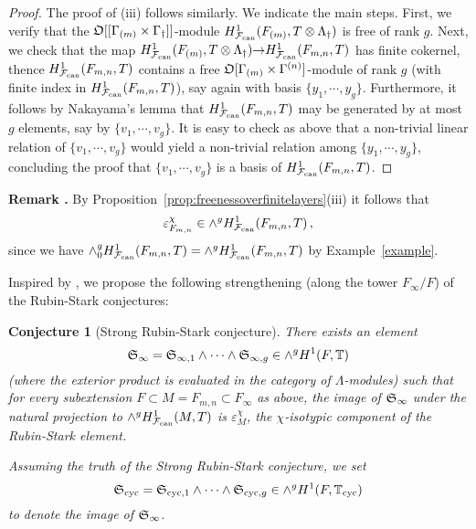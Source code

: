\documentclass[12pt]{amsart}
\numberwithin{equation}{section}
\newtheorem{conj}[thm]{Conjecture}
\newenvironment{rem}{\par\medskip\noindent\refstepcounter{thm}
\bgroup{\hspace*{-0.15 cm}\bf{Remark} \thethm.}\bgroup}{\egroup
\egroup\par\medskip} \parskip 2pt
\begin{document}
\begin{proof}
The proof of (iii) follows similarly. We indicate the main steps. First, we verify that the ${\frak{O}}[[\Gamma_{(m)}\times\Gamma_\dagger]]$-module $H^1_{\mathcal{F}_{\textup{\lowercase{can}}}}(F_{(m)},T\otimes{\Lambda}_{\dagger})$ is free of rank $g$. Next, we check that  the map $H^1_{\mathcal{F}_{\textup{\lowercase{can}}}}(F_{(m)},T\otimes{\Lambda}_{\dagger}){\rightarrow} H^1_{\mathcal{F}_{\textup{\lowercase{can}}}}(F_{m,n},T)$ has finite cokernel, thence $H^1_{\mathcal{F}_{\textup{\lowercase{can}}}}(F_{m,n},T)$ contains a free ${\frak{O}}[\Gamma_{(m)}\times\Gamma^{(n)}]$-module of rank $g$ (with finite index in $ H^1_{\mathcal{F}_{\textup{\lowercase{can}}}}(F_{m,n},T)$), say again with basis $\{y_1,\cdots,y_g\}$. Furthermore, it follows by Nakayama's lemma that $H^1_{\mathcal{F}_{\textup{\lowercase{can}}}}(F_{m,n},T)$ may be generated by at most $g$ elements, say by $\{v_1,\cdots,v_g\}$. It is easy to check as above that a non-trivial linear relation of $\{v_1,\cdots,v_g\}$ would yield a non-trivial relation among $\{y_1,\cdots,y_g\}$, concluding the proof that $\{v_1,\cdots,v_g\}$ is a basis of $H^1_{\mathcal{F}_{\textup{\lowercase{can}}}}(F_{m,n},T)$.
\end{proof}
\begin{rem}
\label{rem:RSaresomewhatintegral}
By Proposition~\ref{prop:freenessoverfinitelayers}(iii) it follows that 
$$\varepsilon_{F_{m,n}}^{\chi} \in \wedge^g H^1_{\mathcal{F}_{\textup{\lowercase{can}}}}(F_{m,n},T)\,,$$
since we have $\wedge^g_0 H^1_{\mathcal{F}_{\textup{\lowercase{can}}}}(F_{m,n},T)=\wedge^g H^1_{\mathcal{F}_{\textup{\lowercase{can}}}}(F_{m,n},T)$ by Example~\ref{example}. 
\end{rem}
Inspired by \cite[Definition 1.2.2]{pr-es}, we propose the following strengthening (along the tower $F_\infty/F$) of the Rubin-Stark conjectures:
\begin{conj}[Strong Rubin-Stark conjecture]
\label{conj:strongRS}
There exists an element 
$$\frak{S}_\infty=\frak{S}_{\infty,1}\wedge \cdots \wedge \frak{S}_{\infty,g} \in \wedge^g H^1(F,{\mathbb{T}})$$
(where the exterior product is evaluated in the category of ${\Lambda}$-modules) such that for every subextension $F\subset M=F_{m,n} \subset F_\infty$ as above, the image of $\frak{S}_{\infty}$ under the natural projection to $\wedge^g H^1_{\mathcal{F}_{\textup{\lowercase{can}}}}(M,T)$ is $\varepsilon_{M}^{\chi}$, the $\chi$-isotypic component of the Rubin-Stark element.

Assuming the truth of the Strong Rubin-Stark conjecture, we set 
$$\frak{S}_{\textup{cyc}}=\frak{S}_{{\textup{cyc}},1}\wedge \cdots \wedge \frak{S}_{{\textup{cyc}},g} \in \wedge^g H^1(F,{\mathbb{T}}_{\textup{cyc}})$$
to denote the image of $\frak{S}_{\infty}$.
\end{conj}
\end{document}
